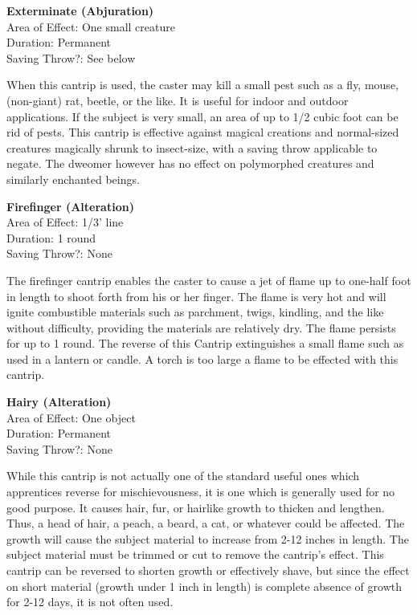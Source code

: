 \documentclass[letterpaper,sansserif,tightsqueeze]{rpg-module}
\begin{document}
\textbf{Exterminate (Abjuration)}\\
Area of Effect: One small creature\\
Duration: Permanent\\
Saving Throw?: See below

When this cantrip is used, the caster may kill a small pest such as a fly, mouse, (non-giant) rat, beetle, or the like. It is useful for indoor and outdoor applications. If the subject is very small, an area of up to 1/2 cubic foot can be rid of pests. This cantrip is effective against magical creations and normal-sized creatures magically shrunk to insect-size, with a saving throw applicable to negate. The dweomer however has no effect on polymorphed creatures and similarly enchanted beings.
	
\textbf{Firefinger (Alteration)}\\
Area of Effect: 1/3' line\\
Duration: 1 round\\
Saving Throw?: None
	
The firefinger cantrip enables the caster to cause a jet of flame up to one-half foot in length to shoot forth from his or her finger. The flame is very hot and will ignite combustible materials such as parchment, twigs, kindling, and the like without difficulty, providing the materials are relatively dry. The flame persists for up to 1 round.
The reverse of this Cantrip extinguishes a small flame such as used in a lantern or candle. A torch is too large a flame to be effected with this cantrip.
	
\textbf{Hairy (Alteration)}\\
Area of Effect: One object\\
Duration: Permanent\\
Saving Throw?: None
	
While this cantrip is not actually one of the standard useful ones which apprentices reverse for mischievousness, it is one which is generally used for no good purpose. It causes hair, fur, or hairlike growth to thicken and lengthen. Thus, a head of hair, a peach, a beard, a cat, or whatever could be affected. The growth will cause the subject material to increase from 2-12 inches in length. The subject material must be trimmed or cut to remove the cantrip’s effect. This cantrip can be reversed to shorten growth or effectively shave, but since the effect on short material (growth under 1 inch in length) is complete absence of growth for 2-12 days, it is not often used.
	
\end{document}
